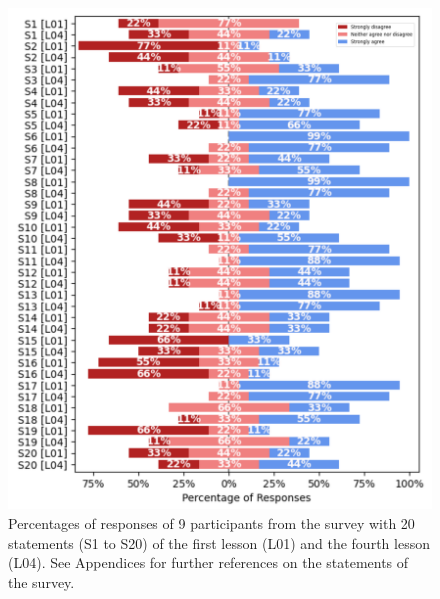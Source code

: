 \documentclass[sigconf]{acmart}
\begin{document}
\begin{figure}[t]
  \centering
    \includegraphics[width=\linewidth]{../figures/results/outputs/drawing-v03.png}  %
    \caption{
    Percentages of responses of 9 participants from the survey with 20 statements (S1 to S20) of the first lesson (L01) and the fourth lesson (L04).
    See Appendices for further references on the statements of the survey.
    }
    \label{fig:results}
\end{figure}
\end{document}
